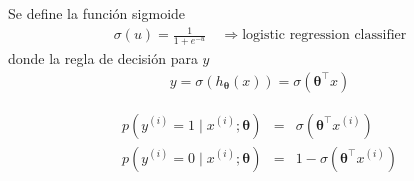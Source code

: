\documentclass[12pt]{article}
\begin{document}
Se define la función sigmoide
\begin{eqnarray}
\sigma(u) = \frac{1}{1 + e^{-u}} \quad \Rightarrow \text{logistic regression classifier}
\end{eqnarray}
donde la regla de decisión para $y$
\begin{eqnarray}
y = \sigma(h_{\boldsymbol{\theta}}(x)) = \sigma(\boldsymbol{\theta}^{\top} x)
\end{eqnarray}

\begin{eqnarray}
p\left(y^{(i)} = 1 \mid x^{(i)}; \boldsymbol{\theta} \right) &=& \sigma(\boldsymbol{\theta}^{\top} x^{(i)})\\
p\left(y^{(i)} = 0 \mid x^{(i)}; \boldsymbol{\theta} \right) &=& 1 - \sigma(\boldsymbol{\theta}^{\top} x^{(i)})
\end{eqnarray}
\end{document}
